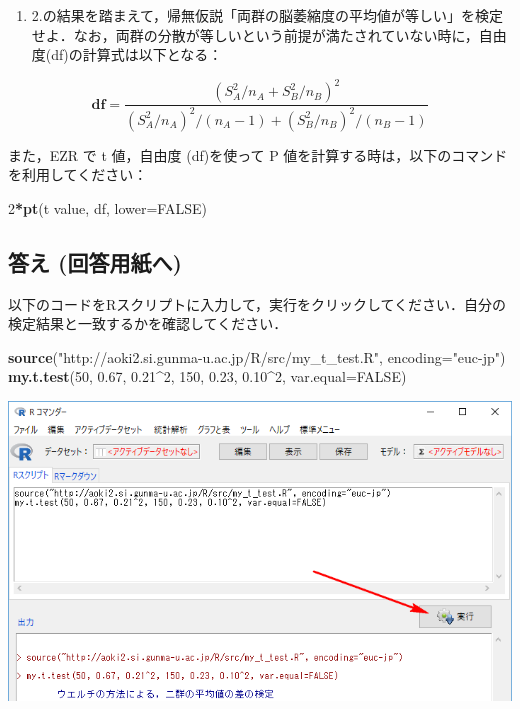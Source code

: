 \documentclass[11pt,]{problemset}
\newenvironment{Shaded}{\begin{snugshade}}{\end{snugshade}}
\newcommand{\DataTypeTok}[1]{\textcolor[rgb]{0.13,0.29,0.53}{#1}}
\newcommand{\DecValTok}[1]{\textcolor[rgb]{0.00,0.00,0.81}{#1}}
\newcommand{\FloatTok}[1]{\textcolor[rgb]{0.00,0.00,0.81}{#1}}
\newcommand{\KeywordTok}[1]{\textcolor[rgb]{0.13,0.29,0.53}{\textbf{#1}}}
\newcommand{\NormalTok}[1]{#1}
\newcommand{\OperatorTok}[1]{\textcolor[rgb]{0.81,0.36,0.00}{\textbf{#1}}}
\newcommand{\OtherTok}[1]{\textcolor[rgb]{0.56,0.35,0.01}{#1}}
\newcommand{\StringTok}[1]{\textcolor[rgb]{0.31,0.60,0.02}{#1}}
\providecommand{\tightlist}{%
  \setlength{\itemsep}{0pt}\setlength{\parskip}{0pt}}
\begin{document}
\begin{enumerate}
\def\labelenumi{\arabic{enumi}.}
\setcounter{enumi}{2}
\tightlist
\item
  2.の結果を踏まえて，帰無仮説「両群の脳萎縮度の平均値が等しい」を検定せよ．なお，両群の分散が等しいという前提が満たされていない時に，自由度(df)の計算式は以下となる：
\end{enumerate}

\begin{equation}
\label{eq:2}
\mathbf{df} = \frac{(S^2_A/n_A + S^2_B/n_B)^2}{(S_A^2/n_A)^2/(n_A-1)+(S_B^2/n_B)^2/(n_B-1)}
\end{equation}

また，EZR で t 値，自由度 (df)を使って P
値を計算する時は，以下のコマンドを利用してください：

\begin{Shaded}
\begin{Highlighting}[]
\DecValTok{2}\OperatorTok{*}\KeywordTok{pt}\NormalTok{(t value, df, }\DataTypeTok{lower=}\OtherTok{FALSE}\NormalTok{)}
\end{Highlighting}
\end{Shaded}

\hypertarget{--2}{%
\subsection{答え (回答用紙へ)}\label{--2}}

以下のコードをRスクリプトに入力して，実行をクリックしてください．自分の検定結果と一致するかを確認してください．

\begin{Shaded}
\begin{Highlighting}[]
\KeywordTok{source}\NormalTok{(}\StringTok{"http://aoki2.si.gunma-u.ac.jp/R/src/my_t_test.R"}\NormalTok{, }\DataTypeTok{encoding=}\StringTok{"euc-jp"}\NormalTok{)}
\KeywordTok{my.t.test}\NormalTok{(}\DecValTok{50}\NormalTok{, }\FloatTok{0.67}\NormalTok{, }\FloatTok{0.21}\OperatorTok{^}\DecValTok{2}\NormalTok{, }\DecValTok{150}\NormalTok{, }\FloatTok{0.23}\NormalTok{, }\FloatTok{0.10}\OperatorTok{^}\DecValTok{2}\NormalTok{, }\DataTypeTok{var.equal=}\OtherTok{FALSE}\NormalTok{)}
\end{Highlighting}
\end{Shaded}

\begin{center}\includegraphics[width=0.9\linewidth]{pic/myttest02cut} \end{center}
\end{document}
